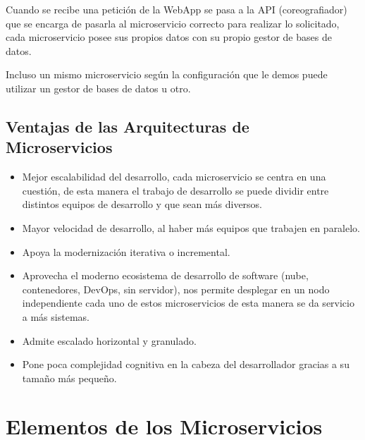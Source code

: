 \documentclass[12pt, twoside, openright]{report} %
\begin{document}
Cuando se recibe una petición de la WebApp se pasa a la API (coreografiador) que se encarga de pasarla al microservicio correcto para realizar lo solicitado, cada microservicio posee sus propios datos con su propio gestor de bases de datos.

Incluso un mismo microservicio según la configuración que le demos puede utilizar un gestor de bases de datos u otro.

\subsection{Ventajas de las Arquitecturas de Microservicios}
\begin{itemize}
	\item Mejor escalabilidad del desarrollo, cada microservicio se centra en una cuestión, de esta manera el trabajo de desarrollo se puede dividir entre distintos equipos de desarrollo y que sean más diversos.
	\item Mayor velocidad de desarrollo, al haber más equipos que trabajen en paralelo.
	\item Apoya la modernización iterativa o incremental.
	\item Aprovecha el moderno ecosistema de desarrollo de software (nube, contenedores, DevOps, sin servidor), nos permite desplegar en un nodo independiente cada uno de estos microservicios de esta manera se da servicio a más sistemas.
	\item Admite escalado horizontal y granulado.
	\item Pone poca complejidad cognitiva en la cabeza del desarrollador gracias a su tamaño más pequeño.
\end{itemize}

\section{Elementos de los Microservicios}
\end{document}
